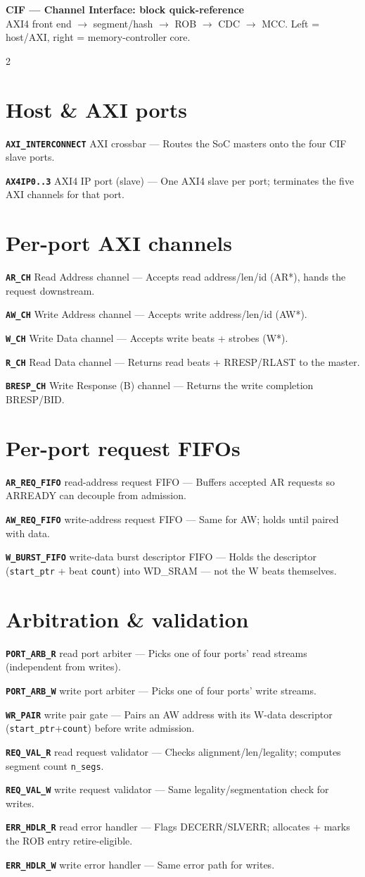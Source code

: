 \documentclass[9pt]{extarticle}
\newcommand{\blk}[3]{\noindent\textbf{\texttt{#1}}\; {\footnotesize\color{ff}#2}\; --- #3\par\vspace{1.5pt}}
\begin{document}
\footnotesize

\begin{center}\normalsize\textbf{CIF — Channel Interface: block quick-reference}\\
{\footnotesize\color{ff}AXI4 front end $\rightarrow$ segment/hash $\rightarrow$ ROB $\rightarrow$ CDC $\rightarrow$ MCC. Left = host/AXI, right = memory-controller core.}\end{center}
\vspace{2pt}

\begin{multicols}{2}

\section{Host \& AXI ports}
\blk{AXI\_INTERCONNECT}{AXI crossbar}{Routes the SoC masters onto the four CIF slave ports.}
\blk{AX4IP0..3}{AXI4 IP port (slave)}{One AXI4 slave per port; terminates the five AXI channels for that port.}

\section{Per-port AXI channels}
\blk{AR\_CH}{Read Address channel}{Accepts read address/len/id (AR*), hands the request downstream.}
\blk{AW\_CH}{Write Address channel}{Accepts write address/len/id (AW*).}
\blk{W\_CH}{Write Data channel}{Accepts write beats + strobes (W*).}
\blk{R\_CH}{Read Data channel}{Returns read beats + RRESP/RLAST to the master.}
\blk{BRESP\_CH}{Write Response (B) channel}{Returns the write completion BRESP/BID.}

\section{Per-port request FIFOs}
\blk{AR\_REQ\_FIFO}{read-address request FIFO}{Buffers accepted AR requests so ARREADY can decouple from admission.}
\blk{AW\_REQ\_FIFO}{write-address request FIFO}{Same for AW; holds until paired with data.}
\blk{W\_BURST\_FIFO}{write-data burst descriptor FIFO}{Holds the descriptor (\texttt{start\_ptr} + beat \texttt{count}) into WD\_SRAM --- not the W beats themselves.}

\section{Arbitration \& validation}
\blk{PORT\_ARB\_R}{read port arbiter}{Picks one of four ports' read streams (independent from writes).}
\blk{PORT\_ARB\_W}{write port arbiter}{Picks one of four ports' write streams.}
\blk{WR\_PAIR}{write pair gate}{Pairs an AW address with its W-data descriptor (\texttt{start\_ptr}+\texttt{count}) before write admission.}
\blk{REQ\_VAL\_R}{read request validator}{Checks alignment/len/legality; computes segment count \texttt{n\_segs}.}
\blk{REQ\_VAL\_W}{write request validator}{Same legality/segmentation check for writes.}
\blk{ERR\_HDLR\_R}{read error handler}{Flags DECERR/SLVERR; allocates + marks the ROB entry retire-eligible.}
\blk{ERR\_HDLR\_W}{write error handler}{Same error path for writes.}


\end{multicols}
\end{document}
